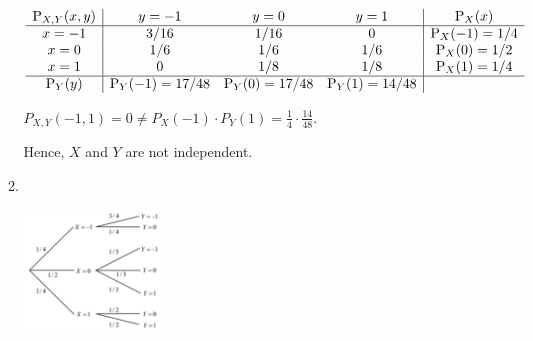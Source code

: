 \documentclass{article}
\begin{document}
\begin{enumerate}
\begin{enumerate}[label=(\alph*)]
        $$
        \begin{array}{c|ccc|c}
            \text P_{X, Y}(x, y) & y = -1 & y = 0 & y = 1 & \text P_X(x) \\
            \hline
            x = -1 & 3 / 16 & 1 / 16 & 0     & \text P_X(-1) = 1 / 4 \\
            x = 0  & 1 / 6  & 1 / 6  & 1 / 6 & \text P_X(0) = 1 / 2 \\
            x = 1  & 0      & 1 / 8  & 1 / 8 & \text P_X(1) = 1 / 4 \\
            \hline
            \text P_Y(y) & \text P_Y(-1) = 17 / 48 & \text P_Y(0) = 17 / 48 & \text P_Y(1) = 14 / 48
        \end{array}
        $$

        $P_{X, Y}(-1, 1) = 0 \ne P_X(-1) \cdot P_Y(1) = \frac{1}{4} \cdot \frac{14}{48}.$

        Hence, $X$ and $Y$ are not independent.

        \item
        
        $ $ \\
        
        \begin{center}
        \includegraphics[width=0.3\textwidth]{img/7.4.10.png}
        \end{center}

    \end{enumerate}
\end{enumerate}
\end{document}
